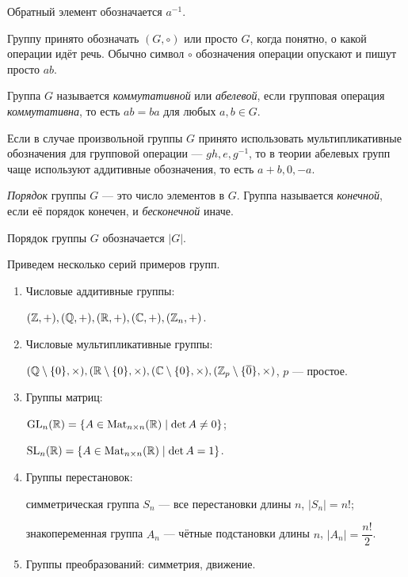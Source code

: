 Обратный элемент обозначается $a^{-1}$.

Группу принято обозначать $(G, \circ)$ или просто $G$, когда понятно, о какой операции идёт речь. Обычно символ $\circ$ обозначения операции опускают и пишут просто $ab$.

\begin{definition}
    Группа $G$ называется \textit{коммутативной} или \textit{абелевой}, если групповая операция \textit{коммутативна}, то есть $ab = ba$ для любых $a, b \in G$.
\end{definition}

Если в случае произвольной группы $G$ принято использовать мультипликативные обозначения для групповой операции --- $gh, e, g^{-1}$, то в теории абелевых групп чаще используют аддитивные обозначения, то есть $a + b, 0, -a$.

\begin{definition}
    \textit{Порядок} группы $G$ --- это число элементов в $G$. Группа называется \textit{конечной}, если её порядок конечен, и \textit{бесконечной} иначе.
\end{definition}

Порядок группы $G$ обозначается $|G|$.

\bigskip
Приведем несколько серий примеров групп.
\begin{enumerate}
\item Числовые аддитивные группы:

    $(\mathbb{Z}, +), (\mathbb{Q}, +), (\mathbb{R}, +), (\mathbb{C}, +), (\mathbb{Z}_n, +)$.

\item Числовые мультипликативные группы:
    
    $(\mathbb{Q} \setminus \{0\}, \times), (\mathbb{R} \setminus \{0\}, \times), (\mathbb{C} \setminus \{0\}, \times), (\mathbb{Z}_p \setminus \{\overline{0}\}, \times)$, $p$ --- простое.

\item Группы матриц:
    
    $\mathrm{GL}_n(\mathbb{R}) = \{A \in \mathrm{Mat}_{n \times n}(\mathbb{R}) \mid \det A \neq 0\}$;

    $\mathrm{SL}_n(\mathbb{R}) = \{A \in \mathrm{Mat}_{n \times n}(\mathbb{R}) \mid \det A = 1\}$.

\item Группы перестановок:

    симметрическая группа $S_n$ --- все перестановки длины $n$, $|S_n| = n!$;

    знакопеременная группа $A_n$ --- чётные подстановки длины $n$, $|A_n| = \dfrac{n!}{2}$.

\item Группы преобразований: симметрия, движение.
\end{enumerate}


